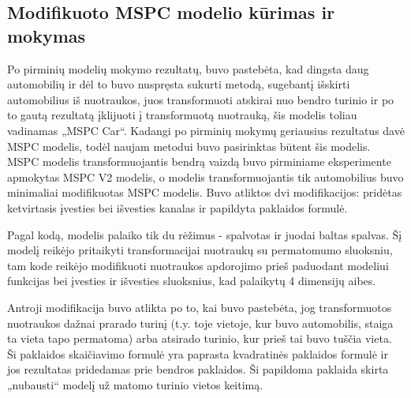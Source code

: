 \documentclass{VUMIFPSbakalaurinis}
\begin{document}
    
    
    \subsection{Modifikuoto MSPC modelio kūrimas ir mokymas}
        Po pirminių modelių mokymo rezultatų, buvo pastebėta, kad dingsta daug automobilių ir dėl to buvo nuspręsta sukurti metodą, sugebantį išskirti automobilius iš nuotraukos, juos transformuoti atskirai nuo bendro turinio ir po to gautą rezultatą įklijuoti į transformuotą nuotrauką, šis modelis toliau vadinamas „MSPC Car“. Kadangi po pirminių mokymų geriausius rezultatus davė MSPC modelis, todėl naujam metodui buvo pasirinktas būtent šis modelis. MSPC modelis transformuojantis bendrą vaizdą buvo pirminiame eksperimente apmokytas MSPC V2 modelis, o modelis transformuojantis tik automobilius buvo minimaliai modifikuotas MSPC modelis. Buvo atliktos dvi modifikacijos: pridėtas ketvirtasis įvesties bei išvesties kanalas ir papildyta paklaidos formulė. 
        
        Pagal kodą, modelis palaiko tik du rėžimus - spalvotas ir juodai baltas spalvas. Šį modelį reikėjo pritaikyti transformacijai nuotraukų su permatomumo sluoksniu, tam kode reikėjo modifikuoti nuotraukos apdorojimo prieš paduodant modeliui funkcijas bei įvesties ir išvesties sluoksnius, kad palaikytų 4 dimensijų aibes. 
        
        Antroji modifikacija buvo atlikta po to, kai buvo pastebėta, jog transformuotos nuotraukos dažnai prarado turinį (t.y. toje vietoje, kur buvo automobilis, staiga ta vieta tapo permatoma) arba atsirado turinio, kur prieš tai buvo tuščia vieta. Ši paklaidos skaičiavimo formulė yra paprasta kvadratinės paklaidos formulė ir jos rezultatas pridedamas prie bendros paklaidos. Ši papildoma paklaida skirta „nubausti“ modelį už matomo turinio vietos keitimą.
\end{document}
